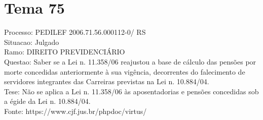 \documentclass[12pt]{article}
\begin{document}
\section*{Tema 75}
Processo: PEDILEF 2006.71.56.000112-0/ RS\\
Situacao: Julgado\\
Ramo: DIREITO PREVIDENCIÁRIO\\
Questao: Saber se a Lei n. 11.358/06 reajustou a base de cálculo das pensões por morte concedidas anteriormente à sua vigência, decorrentes do falecimento de servidores integrantes das Carreiras previstas na Lei n. 10.884/04.\\
Tese: Não se aplica a Lei n. 11.358/06 às aposentadorias e pensões concedidas sob a égide da Lei n. 10.884/04.\\
Fonte: https://www.cjf.jus.br/phpdoc/virtus/
\end{document}
